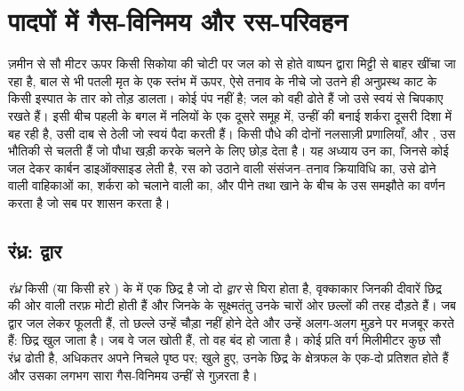 \chapter{पादपों में गैस-विनिमय और रस-परिवहन}\label{ch:b1:plant-transport}

ज़मीन से सौ मीटर ऊपर किसी सिकोया की चोटी पर जल को  से होते
वाष्पन द्वारा मिट्टी से बाहर खींचा जा रहा है, बाल से भी पतली मृत
 के एक स्तंभ में ऊपर, ऐसे तनाव के नीचे जो उतने ही अनुप्रस्थ काट
के किसी इस्पात के तार को तोड़ डालता। कोई पंप नहीं है; जल को वही
 ढोते हैं जो उसे स्वयं से चिपकाए रखते हैं। इसी बीच पहली के
बगल में नलियों के एक दूसरे समूह में, उन्हीं  की बनाई शर्करा
दूसरी दिशा में बह रही है, उसी दाब से ठेली जो  स्वयं पैदा करती
हैं। किसी पौधे की दोनों नलसाज़ी प्रणालियाँ,  और , उस भौतिकी
से चलती हैं जो पौधा खड़ी करके चलने के लिए छोड़ देता है। यह अध्याय उन
 का, जिनसे कोई  जल देकर कार्बन डाइऑक्साइड लेती है, रस को
उठाने वाली संसंजन--तनाव क्रियाविधि का, उसे ढोने वाली वाहिकाओं का, शर्करा
को चलाने वाली  का, और पीने तथा खाने के बीच के उस
समझौते का वर्णन करता है जो सब पर शासन करता है।

\section{रंध्र: द्वार}

\begin{definition}[रंध्र, द्वार कोशिकाएँ]\label{def:b1:plant-transport:stoma}
\emph{रंध्र} किसी  (या किसी हरे ) के  में एक छिद्र है जो
दो \emph{द्वार } से घिरा होता है, वृक्काकार  जिनकी
दीवारें छिद्र की ओर वाली तरफ़ मोटी होती हैं और जिनके  के
सूक्ष्मतंतु उनके चारों ओर छल्लों की तरह दौड़ते हैं। जब द्वार  जल
लेकर फूलती हैं, तो छल्ले उन्हें चौड़ा नहीं होने देते और उन्हें अलग-अलग
मुड़ने पर मजबूर करते हैं: छिद्र खुल जाता है। जब वे जल खोती हैं, तो वह
बंद हो जाता है। कोई  प्रति वर्ग मिलीमीटर कुछ सौ रंध्र ढोती है,
अधिकतर अपने निचले पृष्ठ पर; खुले हुए, उनके छिद्र  के क्षेत्रफल के
एक-दो प्रतिशत होते हैं और उसका लगभग सारा गैस-विनिमय उन्हीं से गुज़रता है।
\end{definition}

